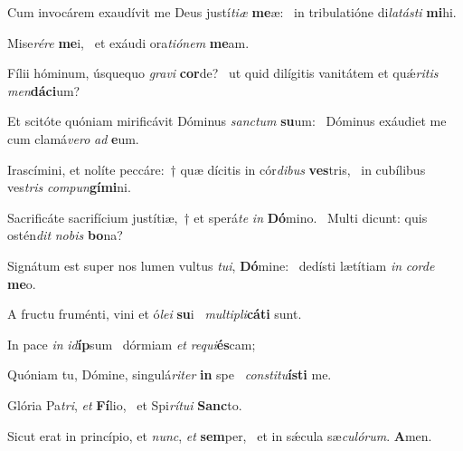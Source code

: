\item Cum invocárem exaudívit me Deus justí\textit{tiæ} \textbf{me}æ:~\psstar{} in tribulatióne di\textit{latásti} \textbf{mi}hi.
\item Mise\textit{rére} \textbf{me}i,~\psstar{} et exáudi ora\textit{tiónem} \textbf{me}am.
\item Fílii hóminum, úsquequo \textit{gravi} \textbf{cor}de?~\psstar{} ut quid dilígitis vanitátem et quǽ\textit{ritis} \textit{men}\textbf{dá}\textbf{ci}um?
\item Et scitóte quóniam mirificávit Dóminus \textit{sanctum} \textbf{su}um:~\psstar{} Dóminus exáudiet me cum clamá\textit{vero} \textit{ad} \textbf{e}um.
\item Irascímini, et nolíte peccáre:~† quæ dícitis in cór\textit{dibus} \textbf{ves}tris,~\psstar{} in cubílibus ves\textit{tris} \textit{compun}\textbf{gí}\textbf{mi}ni.
\item Sacrificáte sacrifícium justítiæ,~† et sperá\textit{te} \textit{in} \textbf{Dó}mino.~\psstar{} Multi dicunt: quis ostén\textit{dit} \textit{nobis} \textbf{bo}na?
\item Signátum est super nos lumen vultus \textit{tui}, \textbf{Dó}mine:~\psstar{} dedísti lætítiam \textit{in} \textit{corde} \textbf{me}o.
\item A fructu fruménti, vini et ó\textit{lei} \textbf{su}i~\psstar{} \textit{multipli}\textbf{cá}\textbf{ti} sunt.
\item In pace \textit{in} \textit{id}\textbf{íp}sum~\psstar{} dórmiam \textit{et} \textit{requi}\textbf{és}cam;
\item Quóniam tu, Dómine, singulá\textit{riter} \textbf{in} spe~\psstar{} \textit{constitu}\textbf{ís}\textbf{ti} me.
\item Glória Pa\textit{tri}, \textit{et} \textbf{Fí}lio,~\psstar{} et Spi\textit{rítui} \textbf{Sanc}to.
\item Sicut erat in princípio, et \textit{nunc}, \textit{et} \textbf{sem}per,~\psstar{} et in sǽcula sæ\textit{culórum}. \textbf{A}men.
